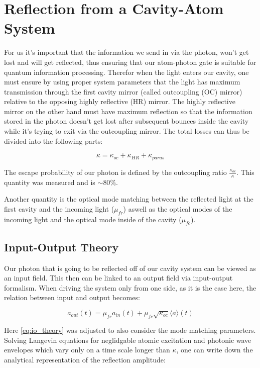 \section{Reflection from a Cavity-Atom System}

For us it's important that the information we send in via the photon, won't get lost and will get reflected, thus ensuring that our atom-photon gate is suitable for quantum information processing. Therefor when the light enters our cavity, one must ensure by using proper system parameters that the light has maximum transmission through the first cavity mirror (called outcoupling (OC) mirror) relative to the opposing highly reflective (HR) mirror. The highly reflective mirror on the other hand must have maximum reflection so that the information stored in the photon doesn't get lost after subsequent bounces inside the cavity while it's trying to exit via the outcoupling mirror. The total losses can thus be divided into the following parts:

\begin{equation}
    \kappa = \kappa_{oc} + \kappa_{HR} + \kappa_{paras}
\end{equation}

The escape probability of our photon is defined by the outcoupling ratio $\frac{\kappa_{oc}}{\kappa}$. This quantity was measured and is $\sim 80\%$.

Another quantity is the optical mode matching between the reflected light at the first cavity and the incoming light ($\mu_{fr}$) aswell as the optical modes of the incoming light and the optical mode inside of the cavity ($\mu_{fc}$).


\subsection{Input-Output Theory}


Our photon that is going to be reflected off of our cavity system can be viewed as an input field. This then can be linked to an output field via input-output formalism.
When driving the system only from one side, as it is the case here, the relation between input and output becomes:\cite{GardinerColletIO1985}

\begin{equation}
    a_{out}(t) = \mu_{fr}a_{in}(t) + \mu_{fc}\sqrt{\kappa_{oc}}\langle a\rangle(t)
    \label{eq:io_theory}
\end{equation}

Here \eqref{eq:io_theory} was adjusted to also consider the mode matching parameters. Solving Langevin equations for neglidgable atomic excitation and photonic wave envelopes which vary only on a time scale longer than $\kappa$, one can write down the analytical representation of the reflection amplitude\cite{HuEtAl2008,TieckeEtAl2014,DominikNThesis2021}:

